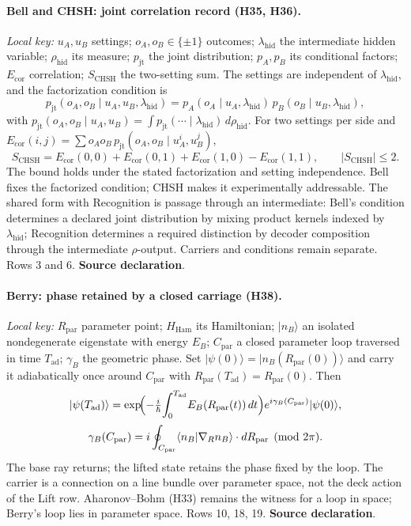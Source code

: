 \documentclass[11pt,a4paper]{article}
\newcommand{\st}[1]{\textsf{\small\textbf{#1}}}
\newcommand{\Ssrc}{\st{Source declaration}}\newcommand{\Sint}{\st{Interface}}
\theoremstyle{plain}
\theoremstyle{definition}
\theoremstyle{remark}
\begin{document}
\paragraph{Bell and CHSH: joint correlation record (H35, H36).} \emph{Local key:} $u_A,u_B$ settings; $o_A,o_B\in\{\pm1\}$ outcomes; $\lambda_{\mathrm{hid}}$ the intermediate hidden variable; $\rho_{\mathrm{hid}}$ its measure; $p_{\mathrm{jt}}$ the joint distribution; $p_A,p_B$ its conditional factors; $E_{\mathrm{cor}}$ correlation; $S_{\mathrm{CHSH}}$ the two-setting sum. The settings are independent of $\lambda_{\mathrm{hid}}$, and the factorization condition is
\[
p_{\mathrm{jt}}(o_A,o_B\mid u_A,u_B,\lambda_{\mathrm{hid}})=p_A(o_A\mid u_A,\lambda_{\mathrm{hid}})\,p_B(o_B\mid u_B,\lambda_{\mathrm{hid}}),
\]
with $p_{\mathrm{jt}}(o_A,o_B\mid u_A,u_B)=\int p_{\mathrm{jt}}(\cdots\mid\lambda_{\mathrm{hid}})\,d\rho_{\mathrm{hid}}$. For two settings per side and $E_{\mathrm{cor}}(i,j)=\sum o_Ao_B\,p_{\mathrm{jt}}(o_A,o_B\mid u_A^i,u_B^j)$,
\[
S_{\mathrm{CHSH}}=E_{\mathrm{cor}}(0,0)+E_{\mathrm{cor}}(0,1)+E_{\mathrm{cor}}(1,0)-E_{\mathrm{cor}}(1,1),\qquad |S_{\mathrm{CHSH}}|\le2 .
\]
The bound holds under the stated factorization and setting independence. Bell fixes the factorized condition; CHSH makes it experimentally addressable. The shared form with Recognition is passage through an intermediate: Bell's condition determines a declared joint distribution by mixing product kernels indexed by $\lambda_{\mathrm{hid}}$; Recognition determines a required distinction by decoder composition through the intermediate $\rho$-output. Carriers and conditions remain separate. Rows 3 and 6. \Ssrc.

\paragraph{Berry: phase retained by a closed carriage (H38).} \emph{Local key:} $R_{\mathrm{par}}$ parameter point; $H_{\mathrm{Ham}}$ its Hamiltonian; $|n_B\rangle$ an isolated nondegenerate eigenstate with energy $E_B$; $C_{\mathrm{par}}$ a closed parameter loop traversed in time $T_{\mathrm{ad}}$; $\gamma_B$ the geometric phase. Set $|\psi(0)\rangle=|n_B(R_{\mathrm{par}}(0))\rangle$ and carry it adiabatically once around $C_{\mathrm{par}}$ with $R_{\mathrm{par}}(T_{\mathrm{ad}})=R_{\mathrm{par}}(0)$. Then
\[
\begin{gathered}
|\psi(T_{\mathrm{ad}})\rangle=\exp\!\Bigl(-\tfrac{i}{\hbar}\!\int_0^{T_{\mathrm{ad}}}\!E_B(R_{\mathrm{par}}(t))\,dt\Bigr)e^{i\gamma_B(C_{\mathrm{par}})}|\psi(0)\rangle,\\[2pt]
\gamma_B(C_{\mathrm{par}})=i\oint_{C_{\mathrm{par}}}\langle n_B|\nabla_Rn_B\rangle\cdot dR_{\mathrm{par}}\pmod{2\pi}.
\end{gathered}
\]
The base ray returns; the lifted state retains the phase fixed by the loop. The carrier is a connection on a line bundle over parameter space, not the deck action of the Lift row. Aharonov--Bohm (H33) remains the witness for a loop in space; Berry's loop lies in parameter space. Rows 10, 18, 19. \Ssrc.
\end{document}
